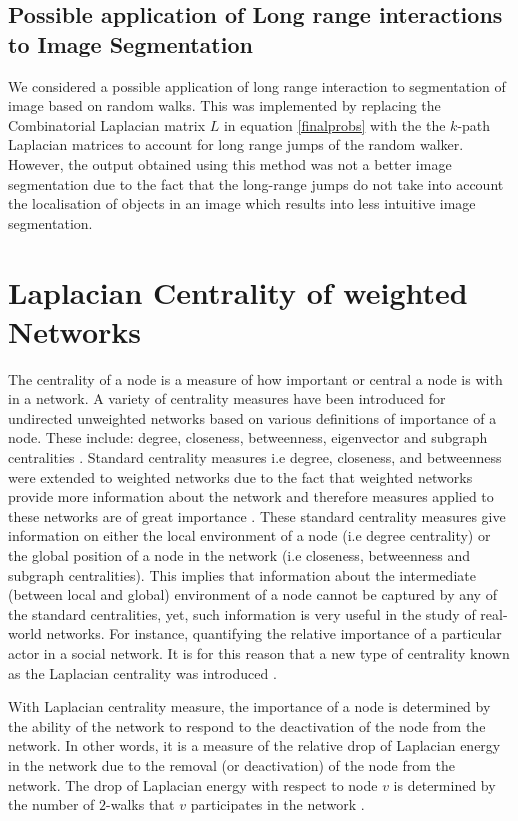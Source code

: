 \documentclass[10pt,a4paper]{article}
\begin{document}
\subsection{Possible application of Long range interactions to Image Segmentation}
We considered a possible application of long range interaction to segmentation of image based on random walks. This was implemented by replacing the Combinatorial Laplacian matrix $L$ in equation \ref{finalprobs}  with the the $k$-path Laplacian matrices to account for long range jumps of the random walker. However, the output obtained using this method was not a better image segmentation due to the fact that the long-range jumps do not take into account the localisation of objects in an image which results into less intuitive image segmentation. 

\newpage
\section{Laplacian Centrality of weighted Networks}
The centrality of a node is a measure of how important or central a node is with in a network. A variety of centrality measures have been introduced for undirected unweighted networks based on various definitions of importance of a node. These include: degree, closeness, betweenness, eigenvector and subgraph centralities \citep{freeman1978centrality,estrada2005subgraph}. Standard centrality measures i.e degree, closeness, and betweenness  were extended to weighted networks due to the fact that weighted networks provide more information about the network and therefore measures applied to these networks are of great importance \citep{newman2001scientific,barrat2004architecture,opsahl2009structure,opsahl2010node}. 
These standard centrality measures give information on either the local environment of a node (i.e degree centrality) or the global position of a node in the network (i.e closeness, betweenness and subgraph centralities). This implies that information about the intermediate (between local and global) environment of a node cannot be captured by any of the standard centralities, yet, such information is very useful in the study of real-world networks. For instance, quantifying the relative importance of a particular actor in a social network. It is for this reason that a new type of centrality known as the Laplacian centrality was introduced \citep{qi2012laplacian}. 


With Laplacian centrality measure, the importance of a node is determined by the ability of the network to respond to the deactivation  of the node from the network. In other words, it is a measure of the relative drop of Laplacian energy in the network due to the removal (or deactivation) of the node from the network. The drop of Laplacian energy with respect to node $v$ is determined by the number of $2$-walks that $v$ participates in the network \citep{qi2012laplacian}. 
\end{document}
